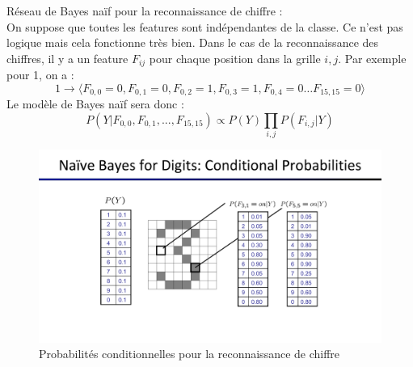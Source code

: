 \begin{example}
    Réseau de Bayes naïf pour la reconnaissance de chiffre :\\

    On suppose que toutes les features sont indépendantes de la classe. Ce n'est pas logique mais cela fonctionne très bien.
    Dans le cas de la reconnaissance des chiffres, il y a un feature $F_{ij}$ pour chaque position dans la grille $i,j$. Par
    exemple pour 1, on a :
    \begin{equation*}
        1 \rightarrow \langle F_{0,0}=0, F_{0,1}=0,F_{0,2}=1,F_{0,3}=1,F_{0,4}=0\dots F_{15,15}=0\rangle
    \end{equation*}
    Le modèle de Bayes naïf sera donc :
    \begin{equation*}
        P(Y|F_{0,0}, F_{0,1}, ..., F_{15,15}) \propto P(Y) \prod_{i,j} P(F_{i,j}|Y)
    \end{equation*}
    \begin{figure}[H]
        \centering
        \includegraphics[width=\linewidth]{pictures/digit_recognition.pdf}
        \caption{Probabilités conditionnelles pour la reconnaissance de chiffre}
    \end{figure}
\end{example}


